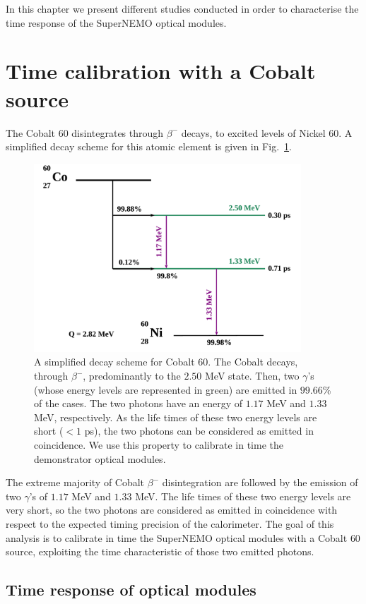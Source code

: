 In this chapter we present different studies conducted in order to characterise the time response of the SuperNEMO optical modules.


\section{Time calibration with a Cobalt source}
\label{sec:CoSource}
The Cobalt $60$ disintegrates through $\beta^{-}$ decays, to excited levels of Nickel $60$.
A simplified decay scheme for this atomic element is given in Fig.~\ref{fig:Co_decay_scheme}.
\begin{figure}[h]
  \centering
  \includegraphics[width=10cm]{commissioning/fig_commissioning/Co_decay_scheme.pdf}
  \caption{A simplified decay scheme for Cobalt $60$.
    The Cobalt decays, through $\beta^{-}$, predominantly to the $2.50$ MeV state.
    Then, two $\gamma$'s (whose energy levels are represented in green) are emitted in $99.66$\% of the cases.
    The two photons have an energy of $1.17$ MeV and $1.33$ MeV, respectively.
    As the life times of these two energy levels are short ($<1$ ps), the two photons can be considered as emitted in coincidence.
    We use this property to calibrate in time the demonstrator optical modules.
    \label{fig:Co_decay_scheme}}
\end{figure}
The extreme majority of Cobalt $\beta^{-}$ disintegration are followed by the emission of two $\gamma$'s of $1.17$ MeV and $1.33$ MeV.
The life times of these two energy levels are very short, so the two photons are considered as emitted in coincidence with respect to the expected timing precision of the calorimeter.
The goal of this analysis is to calibrate in time the SuperNEMO optical modules with a Cobalt $60$ source, exploiting the time characteristic of those two emitted photons.

\subsection{Time response of optical modules}

